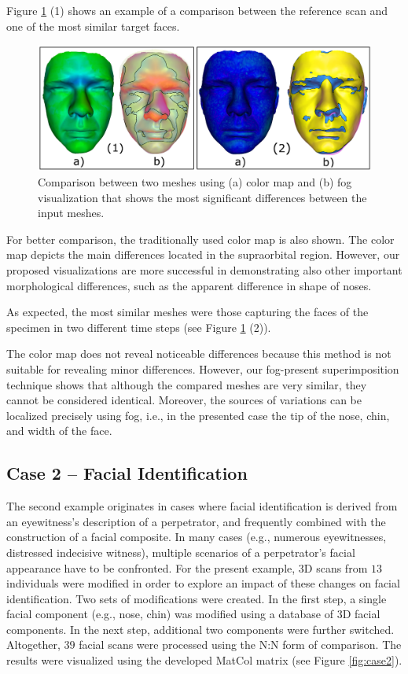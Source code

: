 \documentclass[final,5p,times]{elsarticle}
\begin{document}
Figure \ref{fig:case1} (1) shows an example of a comparison between the reference scan and one of the most similar target faces. 

\begin{figure}[htb]
	\centering
  \includegraphics[width=1\linewidth]{pictures/case1.png}
  \caption{\label{fig:case1}Comparison between two meshes using (a) color map and (b) fog visualization  that shows the most significant differences between the input meshes.}
\end{figure}

For better comparison, the traditionally used color map is also shown.
The color map depicts the main differences located in the supraorbital region. 
However, our proposed visualizations are more successful in demonstrating also other important morphological differences, such as the apparent difference in shape of noses.
 
As expected, the most similar meshes were those capturing the faces of the specimen in two different time steps (see Figure \ref{fig:case1} (2)).  

\begin{sloppypar}
The color map does not reveal noticeable differences because this method is not suitable for revealing minor differences.
However, our fog-present superimposition technique shows that although the compared meshes are very similar, they cannot be considered identical. Moreover, the sources of variations can be localized precisely using fog, i.e., in the presented case the tip of the nose, chin, and width of the face.
\end{sloppypar}

\subsection{Case 2 -- Facial Identification}
The second example originates in cases where facial identification is derived from an eyewitness's description of a perpetrator, and frequently combined with the construction of a facial composite. 
In many cases (e.g., numerous eyewitnesses, distressed indecisive witness), multiple scenarios of a perpetrator's facial appearance have to be confronted. For the present example, 3D scans from $13$ individuals were modified in order to explore an impact of these changes on facial identification. 
Two sets of modifications were created. 
In the first step, a single facial component (e.g., nose, chin) was modified using a database of 3D facial components. 
In the next step, additional two components were further switched. 
Altogether, $39$ facial scans were processed using the N:N form of comparison. 
The results were visualized using the developed MatCol matrix (see Figure \ref{fig:case2}).
\end{document}
